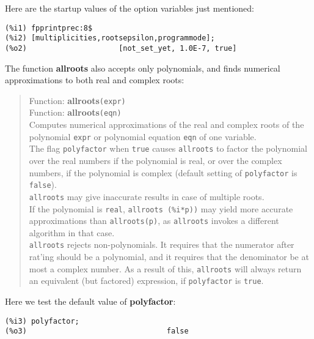 \documentclass[12pt]{article}
\begin{document}
\normalsize
Here are the startup values of the option variables just mentioned:
\small
\begin{verbatim}
(%i1) fpprintprec:8$
(%i2) [multiplicities,rootsepsilon,programmode];
(%o2)                     [not_set_yet, 1.0E-7, true]
\end{verbatim}
\normalsize
The function \textbf{allroots} also accepts only polynomials, and finds
  numerical approximations to both real and complex roots:
\small
\begin{quote}
Function: \textbf{allroots}\verb|(expr) |\\
Function: \textbf{allroots}\verb|(eqn) |\\
Computes numerical approximations of the real and complex roots of the
   polynomial \verb|expr| or polynomial equation \verb|eqn| of one variable. \\
The flag \verb|polyfactor| when \verb|true| causes \verb|allroots| to factor the
   polynomial over the real numbers if the polynomial is real, or over the complex
   numbers, if the polynomial is complex (default setting of \verb|polyfactor| is \verb|false|). \\
\verb|allroots| may give inaccurate results in case of multiple roots.\\
If the polynomial is \verb|real|,
 \verb|allroots (%i*p))| may yield more accurate
   approximations than \verb|allroots(p)|, as \verb|allroots| invokes a different
   algorithm in that case. \\
\verb|allroots| rejects non-polynomials.
It requires that the numerator after rat'ing should be a polynomial, and
   it requires that the denominator be at most a complex number.
As a result of this, \verb|allroots| will always return an equivalent
  (but factored) expression, if \verb|polyfactor| is \verb|true|. 
\end{quote}
\normalsize
Here we test the default value of \textbf{polyfactor}:
\small
\begin{verbatim}
(%i3) polyfactor;
(%o3)                                false
\end{verbatim}
\normalsize
\end{document}
